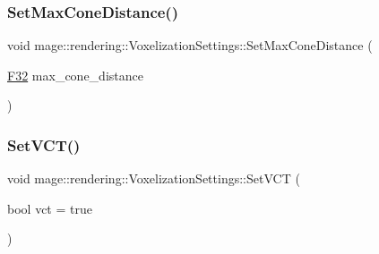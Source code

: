\hypertarget{classmage_1_1rendering_1_1_voxelization_settings_a137c4c2186b5034f546d0b876cd0633e}{}\label{classmage_1_1rendering_1_1_voxelization_settings_a137c4c2186b5034f546d0b876cd0633e} 
\subsubsection{\texorpdfstring{Set\+Max\+Cone\+Distance()}{SetMaxConeDistance()}}
{\footnotesize\ttfamily void mage\+::rendering\+::\+Voxelization\+Settings\+::\+Set\+Max\+Cone\+Distance (\begin{DoxyParamCaption}\item[{\hyperlink{namespacemage_aa97e833b45f06d60a0a9c4fc22ae02c0}{F32}}]{max\+\_\+cone\+\_\+distance }\end{DoxyParamCaption})\hspace{0.3cm}{\ttfamily [noexcept]}}

\hypertarget{classmage_1_1rendering_1_1_voxelization_settings_a394b58dd3d414a406fd874f7e53b211f}{}\label{classmage_1_1rendering_1_1_voxelization_settings_a394b58dd3d414a406fd874f7e53b211f} 
\subsubsection{\texorpdfstring{Set\+V\+C\+T()}{SetVCT()}}
{\footnotesize\ttfamily void mage\+::rendering\+::\+Voxelization\+Settings\+::\+Set\+V\+CT (\begin{DoxyParamCaption}\item[{bool}]{vct = {\ttfamily true} }\end{DoxyParamCaption})\hspace{0.3cm}{\ttfamily [noexcept]}}

\hypertarget{classmage_1_1rendering_1_1_voxelization_settings_ad4a2dd741cdd4187eaaa2492fb1ca533}{}\label{classmage_1_1rendering_1_1_voxelization_settings_ad4a2dd741cdd4187eaaa2492fb1ca533} 
